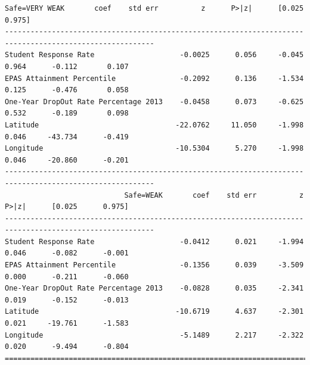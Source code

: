 \documentclass[11pt]{article}
\newcommand{\1}{\mathds{1}}
\begin{document}
\begin{Verbatim}[fontsize=\tiny]
                       Safe=VERY WEAK       coef    std err          z      P>|z|      [0.025      0.975]
---------------------------------------------------------------------------------------------------------
Student Response Rate                    -0.0025      0.056     -0.045      0.964      -0.112       0.107
EPAS Attainment Percentile               -0.2092      0.136     -1.534      0.125      -0.476       0.058
One-Year DropOut Rate Percentage 2013    -0.0458      0.073     -0.625      0.532      -0.189       0.098
Latitude                                -22.0762     11.050     -1.998      0.046     -43.734      -0.419
Longitude                               -10.5304      5.270     -1.998      0.046     -20.860      -0.201
---------------------------------------------------------------------------------------------------------
                            Safe=WEAK       coef    std err          z      P>|z|      [0.025      0.975]
---------------------------------------------------------------------------------------------------------
Student Response Rate                    -0.0412      0.021     -1.994      0.046      -0.082      -0.001
EPAS Attainment Percentile               -0.1356      0.039     -3.509      0.000      -0.211      -0.060
One-Year DropOut Rate Percentage 2013    -0.0828      0.035     -2.341      0.019      -0.152      -0.013
Latitude                                -10.6719      4.637     -2.301      0.021     -19.761      -1.583
Longitude                                -5.1489      2.217     -2.322      0.020      -9.494      -0.804
=========================================================================================================
\end{Verbatim}
\end{document}
